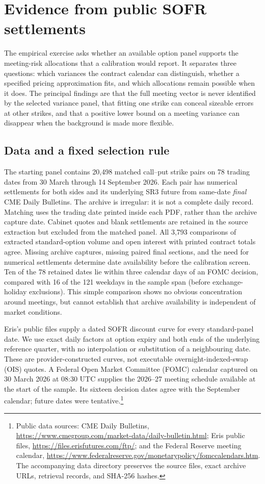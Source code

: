 \section{Evidence from public SOFR settlements}\label{sec:market}\label{sec:empirical}
The empirical exercise asks whether an available option panel supports the meeting-risk allocations that a calibration would report. It separates three questions: which variances the contract calendar can distinguish, whether a specified pricing approximation fits, and which allocations remain possible when it does. The principal findings are that the full meeting vector is never identified by the selected variance panel, that fitting one strike can conceal sizeable errors at other strikes, and that a positive lower bound on a meeting variance can disappear when the background is made more flexible.

\subsection{Data and a fixed selection rule}
The starting panel contains 20,498 matched call--put strike pairs on 78 trading dates from 30 March through 14 September 2026. Each pair has numerical settlements for both sides and its underlying SR3 future from same-date \emph{final} CME Daily Bulletins. The archive is irregular: it is not a complete daily record. Matching uses the trading date printed inside each PDF, rather than the archive capture date. Cabinet quotes and blank settlements are retained in the source extraction but excluded from the matched panel. All 3,793 comparisons of extracted standard-option volume and open interest with printed contract totals agree. Missing archive captures, missing paired final sections, and the need for numerical settlements determine date availability before the calibration screen. Ten of the 78 retained dates lie within three calendar days of an FOMC decision, compared with 16 of the 121 weekdays in the sample span (before exchange-holiday exclusions). This simple comparison shows no obvious concentration around meetings, but cannot establish that archive availability is independent of market conditions.

Eris's public files supply a dated SOFR discount curve for every standard-panel date. We use exact daily factors at option expiry and both ends of the underlying reference quarter, with no interpolation or substitution of a neighbouring date. These are provider-constructed curves, not executable overnight-indexed-swap (OIS) quotes. A Federal Open Market Committee (FOMC) calendar captured on 30 March 2026 at 08:30 UTC supplies the 2026--27 meeting schedule available at the start of the sample. Its sixteen decision dates agree with the September calendar; future dates were tentative.\footnote{Public data sources: CME Daily Bulletins, \url{https://www.cmegroup.com/market-data/daily-bulletin.html}; Eris public files, \url{https://files.erisfutures.com/ftp/}; and the Federal Reserve meeting calendar, \url{https://www.federalreserve.gov/monetarypolicy/fomccalendars.htm}. The accompanying data directory preserves the source files, exact archive URLs, retrieval records, and SHA-256 hashes.}

